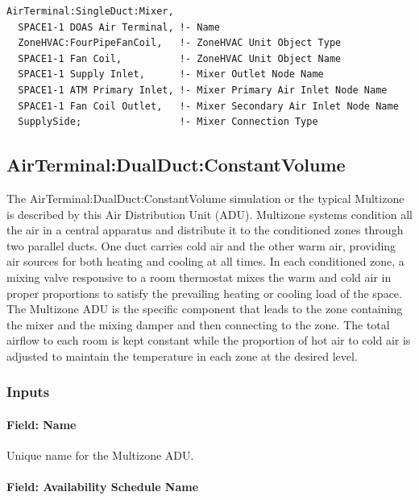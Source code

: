 \begin{lstlisting}
AirTerminal:SingleDuct:Mixer,
  SPACE1-1 DOAS Air Terminal, !- Name
  ZoneHVAC:FourPipeFanCoil,   !- ZoneHVAC Unit Object Type
  SPACE1-1 Fan Coil,          !- ZoneHVAC Unit Object Name
  SPACE1-1 Supply Inlet,      !- Mixer Outlet Node Name
  SPACE1-1 ATM Primary Inlet, !- Mixer Primary Air Inlet Node Name
  SPACE1-1 Fan Coil Outlet,   !- Mixer Secondary Air Inlet Node Name
  SupplySide;                 !- Mixer Connection Type
\end{lstlisting}

\subsection{AirTerminal:DualDuct:ConstantVolume}\label{airterminaldualductconstantvolume}

The AirTerminal:DualDuct:ConstantVolume simulation or the typical Multizone is described by this Air Distribution Unit (ADU). Multizone systems condition all the air in a central apparatus and distribute it to the conditioned zones through two parallel ducts. One duct carries cold air and the other warm air, providing air sources for both heating and cooling at all times. In each conditioned zone, a mixing valve responsive to a room thermostat mixes the warm and cold air in proper proportions to satisfy the prevailing heating or cooling load of the space. The Multizone ADU is the specific component that leads to the zone containing the mixer and the mixing damper and then connecting to the zone. The total airflow to each room is kept constant while the proportion of hot air to cold air is adjusted to maintain the temperature in each zone at the desired level.

\subsubsection{Inputs}\label{inputs-14-000}

\paragraph{Field: Name}\label{field-name-14}

Unique name for the Multizone ADU.

\paragraph{Field: Availability Schedule Name}\label{field-availability-schedule-name-11}

